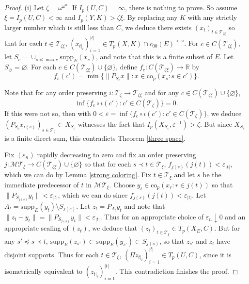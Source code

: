 \documentclass[12pt]{amsart}
\theoremstyle{definition}
\newcommand{\rr}{\mathbb{R}}
\newcommand{\mt}{\mathcal{MT}}
\newcommand{\ttt}{\mathcal{T}}
\newcommand{\supp}{\mathrm{supp}}
\begin{document}
\begin{proof}  (i) Let $\zeta=\omega^{\omega^\alpha}$.  If $I_p(U, C)=\infty$, there is nothing to prove.  So assume $\xi=I_p(U,C)<\infty$ and $I_p(Y, K)>\zeta\xi$.  By replacing any $K$ with any strictly larger number which is still less than $C$, we deduce there exists $(x_t)_{t\in \ttt_{\zeta\xi}}$ so that for each $t\in \ttt_{\zeta\xi}$, $(x_{t|_i})_{i=1}^{|t|}\in T_p(X, K)\cap c_{00}(E)^{<\omega}$.  For $c\in C(\ttt_{\zeta\xi})$, let $S_c=\cup_{s\preceq \max c}\supp_E(x_s)$, and note that this is a finite subset of $E$. Let $S_\varnothing=\varnothing$. For each $c\in C(\ttt_{\zeta\xi})\cup \{\varnothing\}$, define $f_c:C(\ttt_{\zeta\xi})\to \rr$ by $$f_{c}(c')= \min \{\|P_{S_{c}} x\|: x\in \text{co}_p(x_s:s\in c')\}.$$ 


 Note that for any order preserving $i:\ttt_\zeta\to \ttt_{\zeta\xi}$ and for any $c\in C(\ttt_{\zeta\xi})\cup \{\varnothing\}$, $$\inf \{f_c\circ i(c'): c'\in C(\ttt_\zeta)\}=0.$$ If this were not so, then with $0<\varepsilon= \inf \{f_c\circ i(c'):c'\in C(\ttt_\zeta)\}$, we deduce $(P_{S_c}x_{i(s)})_{s\in \ttt_\zeta}\subset X_{S_c}$ witnesses the fact that $I_p(X_{S_c}, \varepsilon^{-1})>\zeta$.  But since $X_{S_c}$ is a finite direct sum, this contradicts Theorem \ref{three space}.  

Fix $(\varepsilon_n)$ rapidly decreasing to zero and fix an order preserving $j:\mt_\xi\to C(\ttt_{\zeta\xi})\cup \{\varnothing\}$ so that for each $s\prec t\in \ttt_\xi$, $f_{j(s)}(j(t))<\varepsilon_{|t|}$, which we can do by Lemma \ref{strong coloring}.  Fix $t\in \ttt_\xi$ and let $s$ be the immediate predecessor of $t$ in $\mt_\xi$.  Choose $y_t\in \text{co}_p(x_r: r\in j(t))$ so that $\|P_{S_{j(s)}} y_t\|<\varepsilon_{|t|}$, which we can do since $f_{j(s)}(j(t))<\varepsilon_{|t|}$.  Let $A_t=\supp_E(y_t)\setminus S_{j(s)}$.  Let $z_t= P_{A_t} y_t$ and note that $\|z_t- y_t\| = \|P_{S_{j(s)}}y_t\|<\varepsilon_{|t|}.$ Thus for an appropriate choice of $\varepsilon_n\downarrow 0$ and an appropriate scaling of $(z_t)$, we deduce that $(z_t)_{t\in \ttt_\xi}\in T_p(X_E, C)$. But for any $s'\preceq s\prec t$, $\supp_E(z_{s'})\subset \supp_E(y_{s'})\subset S_{j(s)}$, so that $z_{s'}$ and $z_t$ have disjoint supports.  Thus for each $t\in \ttt_\xi$, $(\Pi z_{t|_i})_{i=1}^{|t|}\in T_p(U, C)$, since it is isometrically equivalent to $(z_{t|_i})_{i=1}^{|t|}$.  This contradiction finishes the proof.  




\end{proof}
\end{document}
